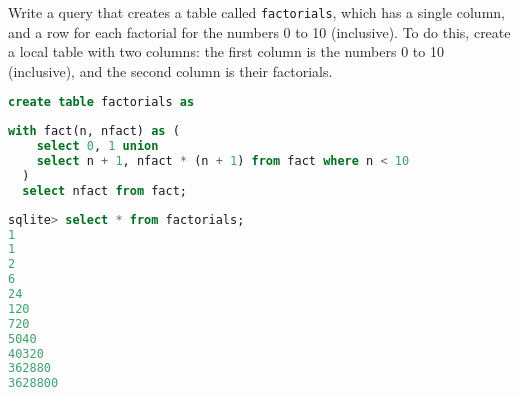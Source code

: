 \question
Write a query that creates a table called \texttt{factorials}, which has a
single column, and a row for each factorial for the numbers 0 to 10 (inclusive).
To do this, create a local table with two columns: the first column is the
numbers 0 to 10 (inclusive), and the second column is their factorials.

\begin{lstlisting}[language=SQL]
create table factorials as
\end{lstlisting}
\begin{solution}[3.5cm]
\begin{lstlisting}[language=SQL]
  with fact(n, nfact) as (
    select 0, 1 union
    select n + 1, nfact * (n + 1) from fact where n < 10
  )
  select nfact from fact;
\end{lstlisting}
\end{solution}
\begin{lstlisting}[language=SQL]
sqlite> select * from factorials;
1
1
2
6
24
120
720
5040
40320
362880
3628800
\end{lstlisting}
